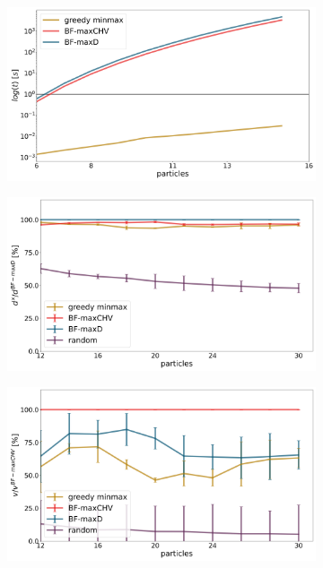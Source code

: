 \begin{figure}[h!]
    \centering
    \begin{subfigure}{0.45\columnwidth}
        \includegraphics[width=\textwidth]{fig/results/algorithm/algorithms_timings.png}
        \caption{}
        \label{fig: time_algorithms}
    \end{subfigure}
    \begin{subfigure}{0.45\columnwidth}
        \includegraphics[width=\textwidth]{fig/results/algorithm/restraint_distance_algorithms_norm.png}
        \caption{}
        \label{fig: dist_algorithms}
    \end{subfigure}
    \begin{subfigure}{0.45\columnwidth}
        \includegraphics[width=\textwidth]{fig/results/algorithm/restraint_volumes_algorithms_norm.png}

\end{subfigure}
\end{figure}

